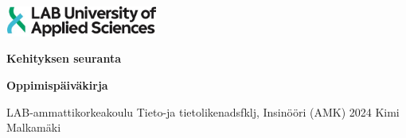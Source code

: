 \documentclass[11pt,a4paper,titlepage,oneside]{article}
\begin{document}
\pagestyle{empty}



\includegraphics[width=5cm,height=1cm]{./src/labimg.jpg}

\vspace{86mm}
\huge
\textbf{Kehityksen seuranta}
\newline

\large

\vspace{5mm}
\textbf{Oppimispäiväkirja}
\normalsize

\vspace{90mm}

LAB-ammattikorkeakoulu \newline
\vspace{2mm}
Tieto-ja tietolikenadsfklj, Insinööri (AMK) \newline
\vspace{2mm}
2024 \newline
\vspace{2mm}
Kimi Malkamäki

\newpage
\end{document}

